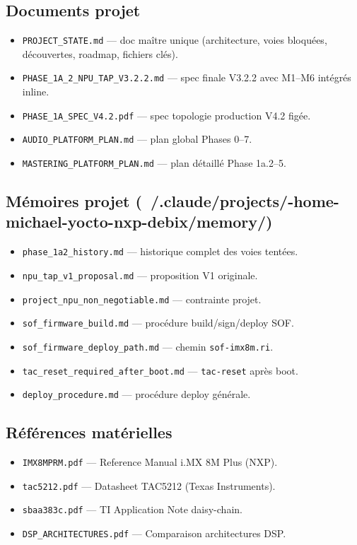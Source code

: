 \documentclass[11pt,a4paper]{article}
\begin{document}
\subsection{Documents projet}

\begin{itemize}[leftmargin=1.2em]
\item \texttt{PROJECT\_STATE.md} — doc maître unique (architecture, voies bloquées,
  découvertes, roadmap, fichiers clés).
\item \texttt{PHASE\_1A\_2\_NPU\_TAP\_V3.2.2.md} — spec finale V3.2.2 avec
  M1--M6 intégrés inline.
\item \texttt{PHASE\_1A\_SPEC\_V4.2.pdf} — spec topologie production V4.2 figée.
\item \texttt{AUDIO\_PLATFORM\_PLAN.md} — plan global Phases 0--7.
\item \texttt{MASTERING\_PLATFORM\_PLAN.md} — plan détaillé Phase 1a.2--5.
\end{itemize}

\subsection{Mémoires projet (~/.claude/projects/-home-michael-yocto-nxp-debix/memory/)}

\begin{itemize}[leftmargin=1.2em]
\item \texttt{phase\_1a2\_history.md} — historique complet des voies tentées.
\item \texttt{npu\_tap\_v1\_proposal.md} — proposition V1 originale.
\item \texttt{project\_npu\_non\_negotiable.md} — contrainte projet.
\item \texttt{sof\_firmware\_build.md} — procédure build/sign/deploy SOF.
\item \texttt{sof\_firmware\_deploy\_path.md} — chemin \texttt{sof-imx8m.ri}.
\item \texttt{tac\_reset\_required\_after\_boot.md} — \texttt{tac-reset} après boot.
\item \texttt{deploy\_procedure.md} — procédure deploy générale.
\end{itemize}

\subsection{Références matérielles}

\begin{itemize}[leftmargin=1.2em]
\item \texttt{IMX8MPRM.pdf} — Reference Manual i.MX 8M Plus (NXP).
\item \texttt{tac5212.pdf} — Datasheet TAC5212 (Texas Instruments).
\item \texttt{sbaa383c.pdf} — TI Application Note daisy-chain.
\item \texttt{DSP\_ARCHITECTURES.pdf} — Comparaison architectures DSP.
\end{itemize}
\end{document}
